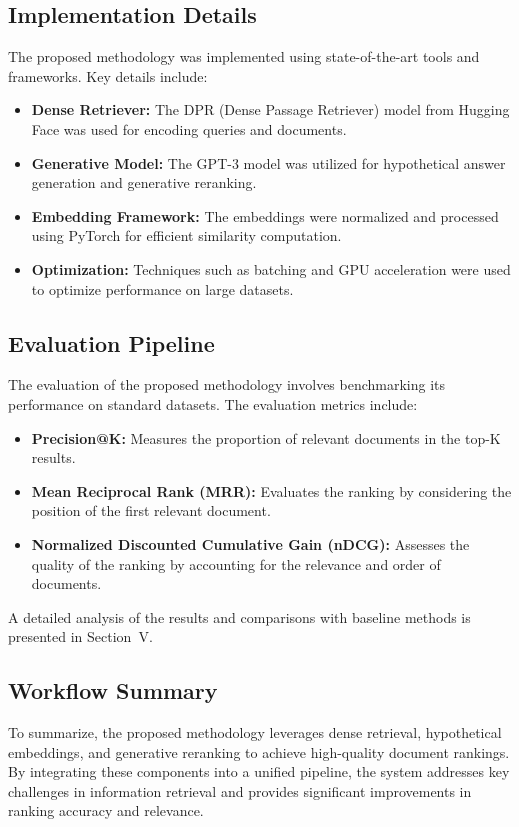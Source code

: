 \subsection{Implementation Details}
The proposed methodology was implemented using state-of-the-art tools and frameworks. Key details include:
\begin{itemize}
    \item \textbf{Dense Retriever:} The DPR (Dense Passage Retriever) model from Hugging Face was used for encoding queries and documents.
    \item \textbf{Generative Model:} The GPT-3 model was utilized for hypothetical answer generation and generative reranking.
    \item \textbf{Embedding Framework:} The embeddings were normalized and processed using PyTorch for efficient similarity computation.
    \item \textbf{Optimization:} Techniques such as batching and GPU acceleration were used to optimize performance on large datasets.
\end{itemize}

\subsection{Evaluation Pipeline}
The evaluation of the proposed methodology involves benchmarking its performance on standard datasets. The evaluation metrics include:
\begin{itemize}
    \item \textbf{Precision@K:} Measures the proportion of relevant documents in the top-K results.
    \item \textbf{Mean Reciprocal Rank (MRR):} Evaluates the ranking by considering the position of the first relevant document.
    \item \textbf{Normalized Discounted Cumulative Gain (nDCG):} Assesses the quality of the ranking by accounting for the relevance and order of documents.
\end{itemize}

A detailed analysis of the results and comparisons with baseline methods is presented in Section~V.

\subsection{Workflow Summary}
To summarize, the proposed methodology leverages dense retrieval, hypothetical embeddings, and generative reranking to achieve high-quality document rankings. By integrating these components into a unified pipeline, the system addresses key challenges in information retrieval and provides significant improvements in ranking accuracy and relevance.
